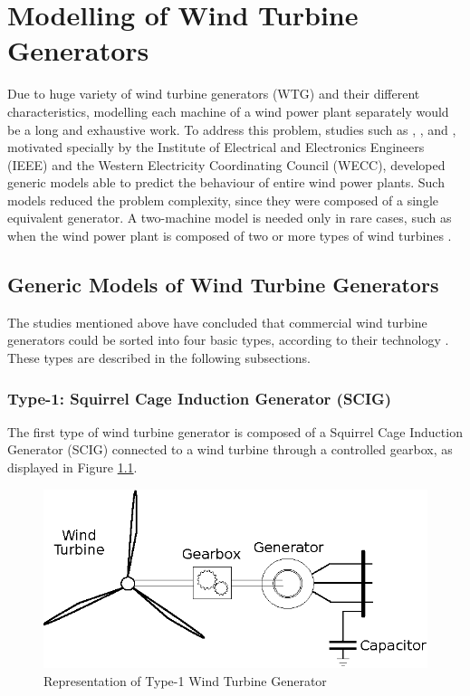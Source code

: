 \chapter{Modelling of Wind Turbine Generators}

\label{ch: Mod}

Due to huge variety of wind turbine generators (WTG) and their different characteristics, modelling each machine of a wind power plant separately would be a long and exhaustive work. To address this problem, studies such as \cite{Muljadi2008}, \cite{Ellis2011}, \cite{council2008wecc} and \cite{Asmine2011}, motivated specially by the Institute of Electrical and Electronics Engineers (IEEE) and the Western Electricity Coordinating Council (WECC), developed generic models able to predict the behaviour of entire wind power plants. Such models reduced the problem complexity, since they were composed of a single equivalent generator. A two-machine model is needed only in rare cases, such as when the wind power plant is composed of two or more types of wind turbines \cite{Ellis2011}.

\section{Generic Models of Wind Turbine Generators}

The studies mentioned above have concluded that commercial wind turbine generators could be sorted into four basic types, according to their technology \cite{Ellis2011}. These types are described in the following subsections.

\subsection{Type-1: Squirrel Cage Induction Generator (SCIG)}

The first type of wind turbine generator is composed of a Squirrel Cage Induction Generator (SCIG) connected to a wind turbine through a controlled gearbox, as displayed in Figure \ref{fig: WTG1}.

\begin{figure}[h]
	\caption{Representation of Type-1 Wind Turbine Generator}
	\begin{center}
		\includegraphics[scale=.8]{Images/Type1WTG.eps}
	\end{center}
	\label{fig: WTG1}
\end{figure}

